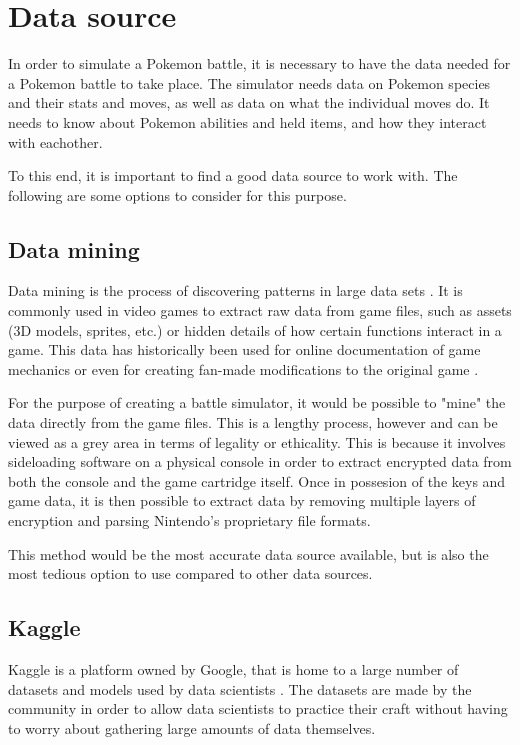 \section{Data source}
\label{sec:data-source}

In order to simulate a Pokemon battle, it is necessary to have the data needed for a Pokemon battle to take place.
The simulator needs data on Pokemon species and their stats and moves, as well as data on what the individual moves do.
It needs to know about Pokemon abilities and held items, and how they interact with eachother.

To this end, it is important to find a good data source to work with. The following are some options to consider
for this purpose.

\subsection{Data mining}
Data mining is the process of discovering patterns in large data sets \cite{DataMining}. It is commonly used in video games to extract raw data 
from game files, such as assets (3D models, sprites, etc.) or hidden details of how certain functions interact in a game. This data has historically
been used for online documentation of game mechanics \cite{DataMiningPokemon} or even for creating fan-made modifications to the original game \cite{RenegadePlatinum}.

For the purpose of creating a battle simulator, it would be possible to "mine" the data directly from the game files. This is a lengthy process, however
and can be viewed as a grey area in terms of legality or ethicality. This is because it involves sideloading software on a physical console in order to
extract encrypted data from both the console and the game cartridge itself. Once in possesion of the keys and game data, it is then possible to extract
data by removing multiple layers of encryption and parsing Nintendo's proprietary file formats.

This method would be the most accurate data source available, but is also the most tedious option to use compared to other data sources.

\subsection{Kaggle}
Kaggle is a platform owned by Google, that is home to a large number of datasets and models used by data scientists \cite{WhatIsKaggle}.
The datasets are made by the community in order to allow data scientists to practice their craft without having to worry about gathering large amounts of
data themselves. 

